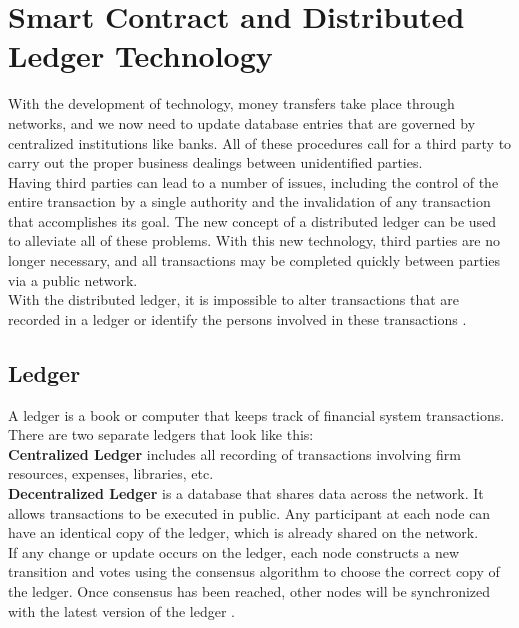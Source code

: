 \chapter{Smart Contract and Distributed Ledger Technology}
With the development of technology, money transfers take place through networks, and we now need to update database entries that are governed by centralized institutions like banks. All of these procedures call for a third party to carry out the proper business dealings between unidentified parties. \\
Having third parties can lead to a number of issues, including the control of the entire transaction by a single authority and the invalidation of any transaction that accomplishes its goal. The new concept of a distributed ledger can be used to alleviate all of these problems. With this new technology, third parties are no longer necessary, and all transactions may be completed quickly between parties via a public network.\\
With the distributed ledger, it is impossible to alter transactions that are recorded in a ledger or identify the persons involved in these transactions \cite {Masood}. 
\section{Ledger} 
A ledger is a book or computer that keeps track of financial system transactions. There are two separate ledgers that look like this: \\
\textbf{Centralized Ledger} includes all recording of transactions involving firm resources, expenses, libraries, etc.\\
\textbf{Decentralized Ledger} is a database that shares data across the network. It allows transactions to be executed in public. Any participant at each node can have an identical copy of the ledger, which is already shared on the network.\\
If any change or update occurs on the ledger, each node constructs a new transition and votes using the consensus algorithm to choose the correct copy of the ledger. Once consensus has been reached, other nodes will be synchronized with the latest version of the ledger \cite{Ozsu}.

